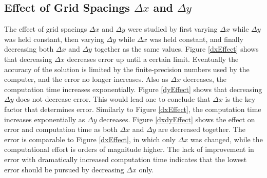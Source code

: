 \documentclass[10pt]{article}
\begin{document}
\subsection*{Effect of Grid Spacings $\Delta x$ and $\Delta y$}
\vspace{-5pt}

The effect of grid spacings $\Delta x$ and $\Delta y$ were studied by first varying $\Delta x$ while $\Delta y$ was held constant, then varying $\Delta y$ while $\Delta x$ was held constant, and finally decreasing both $\Delta x$ and $\Delta y$ together as the same values. Figure \ref{dxEffect} shows that decreasing $\Delta x$ decreases error up until a certain limit. Eventually the accuracy of the solution is limited by the finite-precision numbers used by the computer, and the error no longer increases. Also as $\Delta x$ decreases, the computation time increases exponentially. Figure \ref{dyEffect} shows that decreasing $\Delta y$ does not decrease error. This would lead one to conclude that $\Delta x$ is the key factor that determines error. Similarly to Figure \ref{dxEffect}, the computation time increases exponentially as $\Delta y$ decreases. Figure \ref{dxdyEffect} shows the effect on error and computation time as both $\Delta x$ and $\Delta y$ are decreased together. The error is comparable to Figure \ref{dxEffect}, in which only $\Delta x$ was changed, while the computational effort is orders of magnitude higher. The lack of improvement in error with dramatically increased computation time indicates that the lowest error should be pursued by decreasing $\Delta x$ only.
\end{document}
